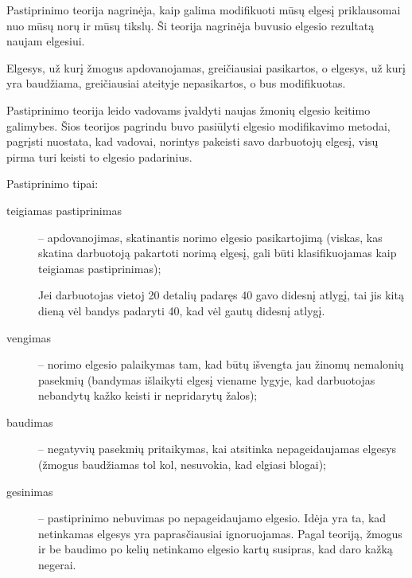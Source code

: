 Pastiprinimo teorija nagrinėja, kaip galima modifikuoti mūsų elgesį
priklausomai nuo mūsų norų ir mūsų tikslų. Ši teorija nagrinėja
buvusio elgesio rezultatą naujam elgesiui.

Elgesys, už kurį žmogus apdovanojamas, greičiausiai pasikartos, o
elgesys, už kurį yra baudžiama, greičiausiai ateityje nepasikartos,
o bus modifikuotas.

Pastiprinimo teorija leido vadovams įvaldyti naujas žmonių elgesio
keitimo galimybes. Šios teorijos pagrindu buvo pasiūlyti elgesio
modifikavimo metodai, pagrįsti nuostata, kad vadovai, norintys
pakeisti savo darbuotojų elgesį, visų pirma turi keisti to elgesio
padarinius.

Pastiprinimo tipai:
\begin{description}
  \item[teigiamas pastiprinimas] – apdovanojimas, skatinantis norimo
    elgesio pasikartojimą (viskas, kas skatina darbuotoją pakartoti norimą
    elgesį, gali būti klasifikuojamas kaip teigiamas pastiprinimas);
    \begin{exmp}
      Jei darbuotojas vietoj 20 detalių padaręs 40 gavo didesnį atlygį,
      tai jis kitą dieną vėl bandys padaryti 40, kad vėl gautų didesnį
      atlygį.
    \end{exmp}
  \item[vengimas] – norimo elgesio palaikymas tam, kad būtų išvengta
    jau žinomų nemalonių pasekmių (bandymas išlaikyti elgesį viename
    lygyje, kad darbuotojas nebandytų kažko keisti ir nepridarytų žalos);
  \item[baudimas] – negatyvių pasekmių pritaikymas, kai atsitinka
    nepageidaujamas elgesys (žmogus baudžiamas tol kol, nesuvokia, kad
    elgiasi blogai);
  \item[gesinimas] – pastiprinimo nebuvimas po nepageidaujamo elgesio.
    Idėja yra ta, kad netinkamas elgesys yra paprasčiausiai ignoruojamas.
    Pagal teoriją, žmogus ir be baudimo po kelių netinkamo elgesio kartų
    susipras, kad daro kažką negerai.
\end{description}


